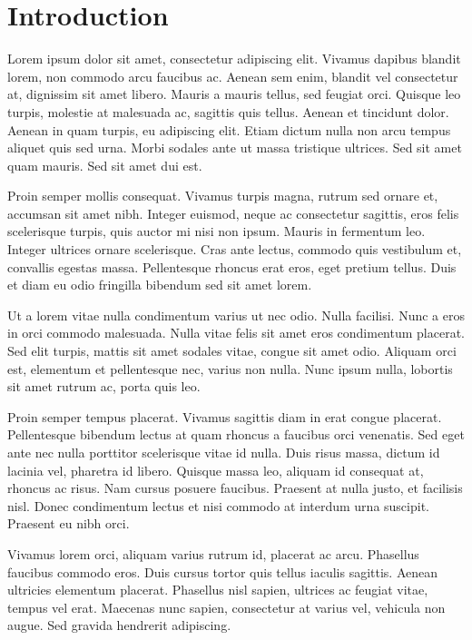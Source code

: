 \section{Introduction}
\label{s:intro}

Lorem ipsum dolor sit amet, consectetur adipiscing elit. Vivamus
dapibus blandit lorem, non commodo arcu faucibus ac. Aenean sem enim,
blandit vel consectetur at, dignissim sit amet libero. Mauris a mauris
tellus, sed feugiat orci. Quisque leo turpis, molestie at malesuada
ac, sagittis quis tellus. Aenean et tincidunt dolor. Aenean in quam
turpis, eu adipiscing elit. Etiam dictum nulla non arcu tempus aliquet
quis sed urna. Morbi sodales ante ut massa tristique ultrices. Sed sit
amet quam mauris. Sed sit amet dui est.

Proin semper mollis consequat. Vivamus turpis magna, rutrum sed ornare
et, accumsan sit amet nibh. Integer euismod, neque ac consectetur
sagittis, eros felis scelerisque turpis, quis auctor mi nisi non
ipsum. Mauris in fermentum leo. Integer ultrices ornare scelerisque.
Cras ante lectus, commodo quis vestibulum et, convallis egestas massa.
Pellentesque rhoncus erat eros, eget pretium tellus. Duis et diam eu
odio fringilla bibendum sed sit amet lorem.

Ut a lorem vitae nulla condimentum varius ut nec odio. Nulla facilisi.
Nunc a eros in orci commodo malesuada. Nulla vitae felis sit amet eros
condimentum placerat. Sed elit turpis, mattis sit amet sodales vitae,
congue sit amet odio. Aliquam orci est, elementum et pellentesque nec,
varius non nulla. Nunc ipsum nulla, lobortis sit amet rutrum ac, porta
quis leo.

Proin semper tempus placerat. Vivamus sagittis diam in erat congue
placerat. Pellentesque bibendum lectus at quam rhoncus a faucibus orci
venenatis. Sed eget ante nec nulla porttitor scelerisque vitae id
nulla. Duis risus massa, dictum id lacinia vel, pharetra id libero.
Quisque massa leo, aliquam id consequat at, rhoncus ac risus. Nam
cursus posuere faucibus. Praesent at nulla justo, et facilisis nisl.
Donec condimentum lectus et nisi commodo at interdum urna suscipit.
Praesent eu nibh orci.

Vivamus lorem orci, aliquam varius rutrum id, placerat ac arcu.
Phasellus faucibus commodo eros. Duis cursus tortor quis tellus
iaculis sagittis. Aenean ultricies elementum placerat. Phasellus nisl
sapien, ultrices ac feugiat vitae, tempus vel erat. Maecenas nunc
sapien, consectetur at varius vel, vehicula non augue. Sed gravida
hendrerit adipiscing.

\cite{example:paper}